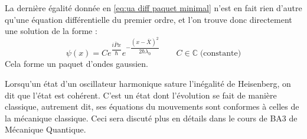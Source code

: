 \documentclass[../notesdecours]{subfiles}
\begin{document}
La dernière égalité donnée en \eqref{eq:ua diff paquet minimal} n'est en fait rien d'autre qu'une équation différentielle du premier ordre, et l'on trouve donc directement une solution de la forme : 
\begin{equation}
    \psi(x) = C e^{\dfrac{i\bar{P}x}{\hbar}} e^{-\dfrac{(x-\bar{X})^2}{2\hbar \lambda_0}} \qquad C \in \mathbb{C} \; \mbox{(constante)}
\end{equation} 
Cela forme un paquet d'ondes gaussien. \\

\begin{remark}
    Lorsqu'un état d'un oscillateur harmonique sature l'inégalité de Heisenberg, on dit que l'état est cohérent. C'est un état dont l'évolution se fait de manière classique, autrement dit, ses équations du mouvements sont conformes à celles de la mécanique classique. Ceci sera discuté plus en détails dans le cours de BA3 de Mécanique Quantique.
\end{remark}
\end{document}
